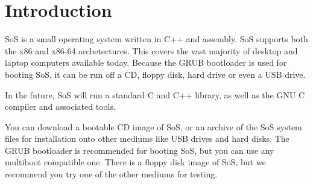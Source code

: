\chapter{Introduction}
SoS is a small operating system written in C++ and assembly. SoS supports both the x86 and x86-64 archetectures.
This covers the vast majority of desktop and laptop computers available today.
Because the GRUB bootloader is used for booting SoS, it
can be run off a CD, floppy disk, hard drive or even a USB drive.

In the future, SoS will run a standard C and C++ library, as well as the GNU C compiler and associated
tools.

You can download a bootable CD image of SoS, or an archive of the SoS system files for installation 
onto other mediums like USB drives and hard disks. The GRUB bootloader is recommended for booting
SoS, but you can use any multiboot compatible one. There is a floppy disk image of SoS, but we recommend
you try one of the other mediums for testing.
